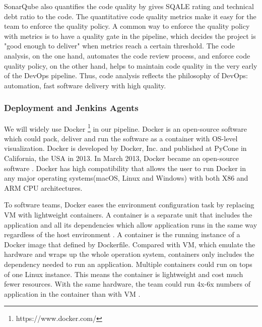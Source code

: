SonarQube also quantifies the code quality by gives SQALE rating and technical debt ratio to the code. The quantitative code quality metrics make it easy for the team to enforce the quality policy. A common way to enforce the quality policy with metrics is to have a quality gate in the pipeline, which decides the project is "good enough to deliver" when metrics reach a certain threshold.
The code analysis, on the one hand, automates the code review process, and enforce code quality policy, on the other hand, helps to maintain code quality in the very early of the DevOps pipeline. Thus, code analysis reflects the philosophy of DevOps: automation, fast software delivery with high quality.
\subsubsection{Deployment and Jenkins Agents}
We will widely use Docker \footnote{https://www.docker.com/} in our pipeline. Docker is an open-source software which could pack, deliver and run the software as a container with OS-level visualization. Docker is developed by Docker, Inc. and published at PyCone in California, the USA in 2013. In March 2013, Docker became an open-source software \cite{avram2013docker}. Docker has high compatibility that allows the user to run Docker in any major operating systems(macOS, Linux and Windows) with both X86 and ARM CPU architectures.
\par
To software teams, Docker eases the environment configuration task by replacing VM with lightweight containers.
A container is a separate unit that includes the application and all its dependencies which allow application runs in the same way regardless of the host environment \cite{WhatisaC60:online}. A container is the running instance of a Docker image that defined by Dockerfile. Compared with VM, which emulate the hardware and wraps up the whole operation system, containers only includes the dependency needed to run an application. Multiple containers could run on tops of one Linux instance. This means the container is lightweight and cost much fewer resources. With the same hardware, the team could run 4x-6x numbers of application in the container than with VM \cite{vaughan2014docker}.


